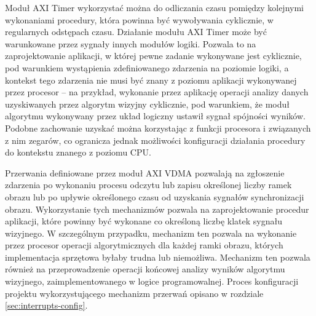 Moduł AXI Timer wykorzystać można do odliczania czasu pomiędzy kolejnymi wykonaniami procedury, która powinna być wywoływania cyklicznie, w regularnych odstępach czasu. 
Działanie modułu AXI Timer może być warunkowane przez sygnały innych modułów logiki. 
Pozwala to na zaprojektowanie aplikacji, w której pewne zadanie wykonywane jest cyklicznie, pod warunkiem wystąpienia zdefiniowanego zdarzenia na poziomie logiki, a kontekst tego zdarzenia nie musi być znany z poziomu aplikacji wykonywanej przez procesor -- na przykład, wykonanie przez aplikację operacji analizy danych uzyskiwanych przez algorytm wizyjny cyklicznie, pod warunkiem, że moduł algorytmu wykonywany przez układ logiczny ustawił sygnał spójności wyników.
Podobne zachowanie uzyskać można korzystając z funkcji procesora i związanych z nim zegarów, co ogranicza jednak możliwości konfiguracji działania procedury do kontekstu znanego z poziomu CPU.

Przerwania definiowane przez moduł AXI VDMA pozwalają na zgłoszenie zdarzenia po wykonaniu procesu odczytu lub zapisu określonej liczby ramek obrazu lub po upływie określonego czasu od uzyskania sygnałów synchronizacji obrazu. %
Wykorzystanie tych mechanizmów pozwala na zaprojektowanie procedur aplikacji, które powinny być wykonane co określoną liczbę klatek sygnału wizyjnego. 
W szczególnym przypadku, mechanizm ten pozwala na wykonanie przez procesor operacji algorytmicznych dla każdej ramki obrazu, których implementacja sprzętowa byłaby trudna lub niemożliwa. 
Mechanizm ten pozwala również na przeprowadzenie operacji końcowej analizy wyników algorytmu wizyjnego, zaimplementowanego w logice programowalnej. %
Proces konfiguracji projektu wykorzystującego mechanizm przerwań opisano w rozdziale \ref{sec:interrupts-config}.